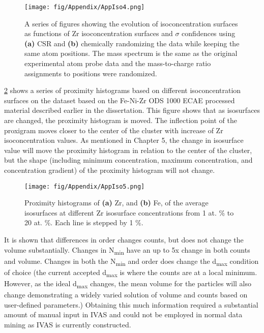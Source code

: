\begin{figure}
	\centering
	\texttt{[image: fig/Appendix/AppIso4.png]}
	\caption[A series of figures showing the evolution of isoconcentration surfaces as functions of Zr isoconcentration surfaces and $\sigma${} confidences]{A series of figures showing the evolution of isoconcentration surfaces as functions of Zr isoconcentration surfaces and $\sigma${} confidences using \textbf{(a)} CSR and \textbf{(b)} chemically randomizing the data while keeping the same atom positions. The mass spectrum is the same as the original experimental atom probe data and the
	mass-to-charge ratio assignments to positions were randomized.}
	\label{fig:AppIso4}
\end{figure}

\ref{fig:AppIso5} shows a series of proximity histograms based on different isoconcentration surfaces on the dataset based on the Fe-Ni-Zr ODS 1000 \celsius{} ECAE processed material described earlier in the dissertation. This figure shows that as isosurfaces are changed, the proximity histogram is moved. The inflection point of the proxigram moves closer to the center of the cluster with  increase of Zr isoconcentration values. As mentioned in Chapter 5, the change in isosurface value will move the proximity histogram in relation to the center of the cluster, but the shape (including minimum concentration, maximum concentration, and concentration gradient) of the proximity histogram will not change.

\begin{figure}
	\centering
	\texttt{[image: fig/Appendix/AppIso5.png]}
	\caption[Proximity histograms of \textbf{(a)} Zr, and \textbf{(b)} Fe, of the average isosurfaces at different Zr isosurface concentrations from 1 at. \% to 20 at. \%.]{Proximity histograms of \textbf{(a)} Zr, and \textbf{(b)} Fe, of the average isosurfaces at different Zr isosurface concentrations from 1 at. \% to 20 at. \%. Each line is stepped by 1 \%. }
	\label{fig:AppIso5}
\end{figure}

It is shown that differences in order changes counts, but does not change the volume substantially. Changes in N\textsubscript{min} have an up to 5x change in both counts and volume. Changes in both the N\textsubscript{min} and order does change the d\textsubscript{max} condition of choice (the current accepted d\textsubscript{max} is where the counts are at a local minimum. However, as the ideal d\textsubscript{max} changes, the mean volume for the particles will also change demonstrating a widely varied solution of volume and counts based on user-defined parameters.) Obtaining this much information required a substantial amount of manual input in IVAS and could not be employed in normal data mining as IVAS is currently constructed.
 
